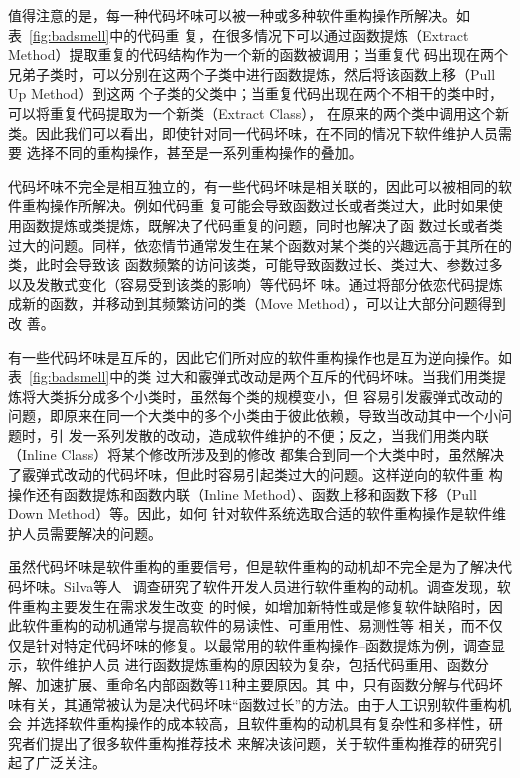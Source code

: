 值得注意的是，每一种代码坏味可以被一种或多种软件重构操作所解决。如表~\ref{fig:badsmell}中的代码重
复，在很多情况下可以通过函数提炼（Extract Method）提取重复的代码结构作为一个新的函数被调用；当重复代
码出现在两个兄弟子类时，可以分别在这两个子类中进行函数提炼，然后将该函数上移（Pull Up Method）到这两
个子类的父类中；当重复代码出现在两个不相干的类中时，可以将重复代码提取为一个新类（Extract Class），
在原来的两个类中调用这个新类。因此我们可以看出，即使针对同一代码坏味，在不同的情况下软件维护人员需要
选择不同的重构操作，甚至是一系列重构操作的叠加。

代码坏味不完全是相互独立的，有一些代码坏味是相关联的，因此可以被相同的软件重构操作所解决。例如代码重
复可能会导致函数过长或者类过大，此时如果使用函数提炼或类提炼，既解决了代码重复的问题，同时也解决了函
数过长或者类过大的问题。同样，依恋情节通常发生在某个函数对某个类的兴趣远高于其所在的类，此时会导致该
函数频繁的访问该类，可能导致函数过长、类过大、参数过多以及发散式变化（容易受到该类的影响）等代码坏
味。通过将部分依恋代码提炼成新的函数，并移动到其频繁访问的类（Move Method），可以让大部分问题得到改
善。

有一些代码坏味是互斥的，因此它们所对应的软件重构操作也是互为逆向操作。如表~\ref{fig:badsmell}中的类
过大和霰弹式改动是两个互斥的代码坏味。当我们用类提炼将大类拆分成多个小类时，虽然每个类的规模变小，但
容易引发霰弹式改动的问题，即原来在同一个大类中的多个小类由于彼此依赖，导致当改动其中一个小问题时，引
发一系列发散的改动，造成软件维护的不便；反之，当我们用类内联（Inline Class）将某个修改所涉及到的修改
都集合到同一个大类中时，虽然解决了霰弹式改动的代码坏味，但此时容易引起类过大的问题。这样逆向的软件重
构操作还有函数提炼和函数内联（Inline Method）、函数上移和函数下移（Pull Down Method）等。因此，如何
针对软件系统选取合适的软件重构操作是软件维护人员需要解决的问题。

虽然代码坏味是软件重构的重要信号，但是软件重构的动机却不完全是为了解决代码坏味。Silva等人
~\cite{silva2016we}调查研究了软件开发人员进行软件重构的动机。调查发现，软件重构主要发生在需求发生改变
的时候，如增加新特性或是修复软件缺陷时，因此软件重构的动机通常与提高软件的易读性、可重用性、易测性等
相关，而不仅仅是针对特定代码坏味的修复。以最常用的软件重构操作--函数提炼为例，调查显示，软件维护人员
进行函数提炼重构的原因较为复杂，包括代码重用、函数分解、加速扩展、重命名内部函数等11种主要原因。其
中，只有函数分解与代码坏味有关，其通常被认为是决代码坏味``函数过长''的方法。由于人工识别软件重构机会
并选择软件重构操作的成本较高，且软件重构的动机具有复杂性和多样性，研究者们提出了很多软件重构推荐技术
来解决该问题，关于软件重构推荐的研究引起了广泛关注。

